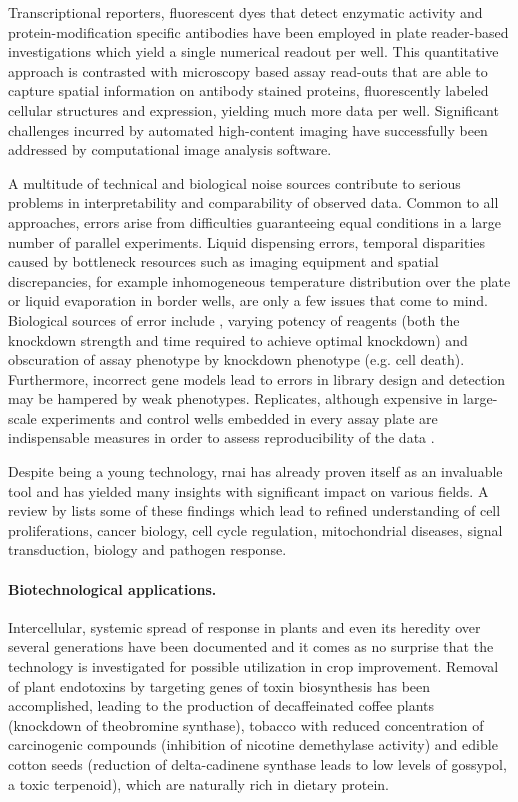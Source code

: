 Transcriptional reporters, fluorescent dyes that detect enzymatic activity and protein-modification specific antibodies have been employed in plate reader-based investigations which yield a single numerical readout per well. This quantitative approach is contrasted with microscopy based assay read-outs that are able to capture spatial information on antibody stained proteins, fluorescently labeled cellular structures and  expression, yielding much more data per well. Significant challenges incurred by automated high-content imaging have successfully been addressed by computational image analysis software.

A multitude of technical and biological noise sources contribute to serious problems in interpretability and comparability of observed data. Common to all  approaches, errors arise from difficulties guaranteeing equal conditions in a large number of parallel experiments. Liquid dispensing errors, temporal disparities caused by bottleneck resources such as imaging equipment and spatial discrepancies, for example inhomogeneous temperature distribution over the plate or liquid evaporation in border wells, are only a few issues that come to mind. Biological sources of error include , varying potency of reagents (both the knockdown strength and time required to achieve optimal knockdown) and obscuration of assay phenotype by knockdown phenotype (e.g. cell death). Furthermore, incorrect gene models lead to errors in library design and detection may be hampered by weak phenotypes. Replicates, although expensive in large-scale experiments and control wells embedded in every assay plate are indispensable measures in order to assess reproducibility of the data \citep{Echeverri2006,Perrimon2007}.

Despite being a young technology, \acrlong{rnai} has already proven itself as an invaluable tool and has yielded many insights with significant impact on various fields. A review by \citet{Mohr2010} lists some of these findings which lead to refined understanding of cell proliferations, cancer biology, cell cycle regulation, mitochondrial diseases, signal transduction,  biology and pathogen response. 

\paragraph{Biotechnological applications.}
Intercellular, systemic spread of  response in plants and even its heredity over several generations have been documented and it comes as no surprise that the technology is investigated for possible utilization in crop improvement. Removal of plant endotoxins by targeting genes of toxin biosynthesis has been accomplished, leading to the production of decaffeinated coffee plants (knockdown of theobromine synthase), tobacco with reduced concentration of carcinogenic compounds (inhibition of nicotine demethylase activity) and edible cotton seeds (reduction of delta-cadinene synthase leads to low levels of gossypol, a toxic terpenoid), which are naturally rich in dietary protein.


